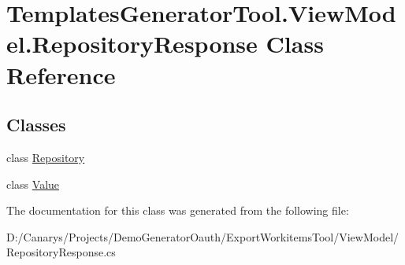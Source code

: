 \hypertarget{class_templates_generator_tool_1_1_view_model_1_1_repository_response}{}\section{Templates\+Generator\+Tool.\+View\+Model.\+Repository\+Response Class Reference}
\label{class_templates_generator_tool_1_1_view_model_1_1_repository_response}
\subsection*{Classes}
\begin{DoxyCompactItemize}
\item 
class \mbox{\hyperlink{class_templates_generator_tool_1_1_view_model_1_1_repository_response_1_1_repository}{Repository}}
\item 
class \mbox{\hyperlink{class_templates_generator_tool_1_1_view_model_1_1_repository_response_1_1_value}{Value}}
\end{DoxyCompactItemize}


The documentation for this class was generated from the following file\+:\begin{DoxyCompactItemize}
\item 
D\+:/\+Canarys/\+Projects/\+Demo\+Generator\+Oauth/\+Export\+Workitems\+Tool/\+View\+Model/Repository\+Response.\+cs\end{DoxyCompactItemize}
